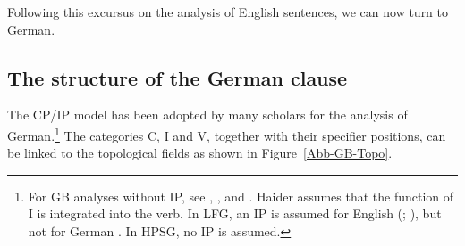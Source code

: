 %

Following this excursus on the analysis of English sentences, we can now turn to German.



\subsection{The structure of the German clause}
\label{sec-German-clause}

The CP/IP model has been adopted by many scholars for the analysis of German.\footnote{\label{fn-ip-vp}%
  For GB analyses without IP, see , ,
   and . Haider assumes
  that the function of I is integrated into the verb. In LFG\indexlfg, an IP is assumed for English
  (\citealp[Section~6.2]{Bresnan2001a}; \citealp[Section~3.2.1]{Dalrymple2001a-u}), but not for German \citep[Section~3.2.3.2]{Berman2003a}.
  In HPSG\indexhpsg, no IP is assumed.
} 
The categories C, I and V, together with their specifier positions, can be linked to the
topological fields as shown in Figure~\vref{Abb-GB-Topo}.

